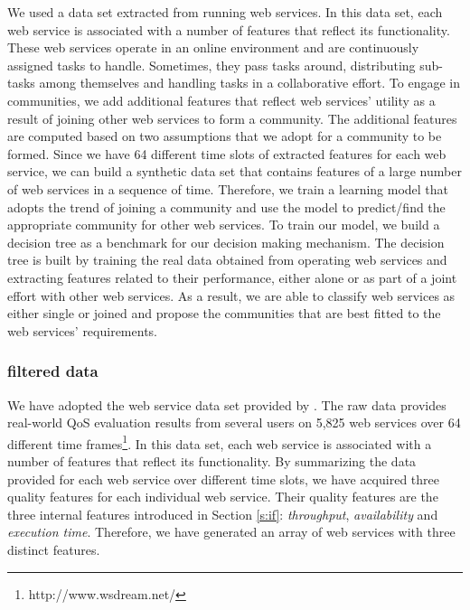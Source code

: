 \documentclass[10pt,journal,cspaper,compsoc]{IEEEtran}
\begin{document}
We used a data set extracted from running web services. In this data set, each web service is associated with a number of features that reflect its functionality. These web services operate in an online environment and are continuously assigned tasks to handle. Sometimes, they pass tasks around, distributing sub-tasks among themselves and handling tasks in a collaborative effort. To engage in communities, we add additional features that reflect web services' utility as a result of joining other web services to form a community. The additional features are computed based on two assumptions that we adopt for a community to be formed. Since we have 64 different time slots of extracted features for each web service, we can build a synthetic data set that contains features of a large number of web services in a sequence of time. Therefore, we train a learning model that adopts the trend of joining a community and use the model to predict/find the appropriate community for other web services. To train our model, we build a decision tree as a benchmark for our decision making mechanism. The decision tree is built by training the real data obtained from operating web services and extracting features related to their performance, either alone or as part of a joint effort with other web services. As a result, we are able to classify web services as either single or joined and propose the communities that are best fitted to the web services' requirements.

\subsubsection{filtered data}\label{sss:filtereddata}

We have adopted the web service data set provided by \cite{10.1109/ISSRE.2011.17}. The raw data provides real-world QoS evaluation results from several users on 5,825 web services over 64 different time frames\footnote{http://www.wsdream.net/}. In this data set, each web service is associated with a number of features that reflect its functionality. By summarizing the data provided for each web service over different time slots, we have acquired three quality features for each individual web service. Their quality features are the three internal features introduced in Section \ref{s:if}: \emph{throughput}, \emph{availability} and \emph{execution time}. 
Therefore, we have generated an array of web services with three distinct features. 
\end{document}
